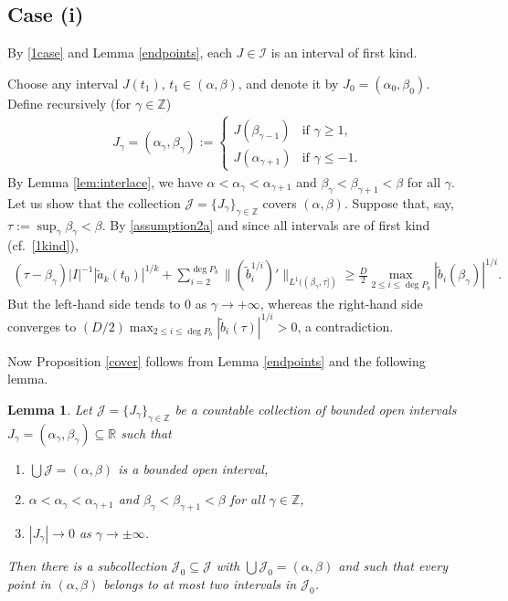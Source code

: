 \documentclass[12pt]{amsart}
\theoremstyle{plain}
\newtheorem{lemma}{Lemma}
\theoremstyle{definition}
\numberwithin{equation}{section}
\begin{document}
\subsection*{Case (i)}
  By \eqref{1case} and Lemma \ref{endpoints}, 
  each $J \in {\mathcal{I}}$ is an interval of first kind. 

  Choose any interval $J(t_1)$, $t_1 \in ({\alpha},{\beta})$, and denote it by $J_0 = ({\alpha}_0,{\beta}_0)$. 
  Define recursively (for ${\gamma} \in {\mathbb{Z}}$)
  \begin{align*}
    J_{\gamma} = ({\alpha}_{\gamma},{\beta}_{\gamma}) := 
    \begin{cases}
      J({\beta}_{{\gamma}-1}) & \text{if } {\gamma} \ge 1, \\
      J({\alpha}_{{\gamma}+1}) & \text{if } {\gamma} \le -1.  
    \end{cases} 
  \end{align*} 
  By Lemma \ref{lem:interlace}, we have ${\alpha} < {\alpha}_{\gamma} < {\alpha}_{{\gamma}+1}$ and ${\beta}_{\gamma} < {\beta}_{{\gamma}+1} < {\beta}$ for all ${\gamma}$.
  Let us show that 
  the collection ${\mathcal{J}} = \{J_{\gamma}\}_{{\gamma} \in {\mathbb{Z}}}$ covers $({\alpha},{\beta})$.   
  Suppose that, say,
  ${\tau} := \sup_{\gamma} {\beta}_{\gamma} <{\beta}$.  
  By \eqref{assumption2a} and since all intervals are of first kind (cf.\ \eqref{1kind}),
  \begin{align*}
    ({\tau} -{\beta}_{\gamma})  |I|^{-1}  {|\tilde a_k(t_0)|^{1/k}}  + \sum_{i=2}^{\deg P_b} \|(\tilde b_i^{1/i})'\|_{L^1 (({\beta}_{\gamma},{\tau}])} 
    \ge   
    \frac{D}{2} \max_{2 \le i \le \deg P_b} |\tilde b_i({\beta}_{\gamma})|^{1/i}. 
  \end{align*}
  But the left-hand side tends to $0$ as ${\gamma} \to +\infty$, whereas the right-hand side converges to 
  $(D/2) \max_{2 \le i \le \deg P_b} |\tilde b_i({\tau})|^{1/i}>0$, a contradiction. 

   
  

  Now Proposition \ref{cover} follows from Lemma \ref{endpoints} and the following lemma.

  \begin{lemma} \label{glue}
  Let ${\mathcal{J}} = \{J_{\gamma}\}_{{\gamma} \in {\mathbb{Z}}}$ be a countable collection of bounded open intervals $J_{\gamma} = ({\alpha}_{\gamma},{\beta}_{\gamma}) \subseteq {\mathbb{R}}$ such that 
  \begin{enumerate}
    \item $\bigcup {\mathcal{J}} = ({\alpha},{\beta})$ is a bounded open interval,
    \item ${\alpha} < {\alpha}_{\gamma} < {\alpha}_{{\gamma}+1}$ and ${\beta}_{\gamma} < {\beta}_{{\gamma}+1}< {\beta}$ for all ${\gamma} \in {\mathbb{Z}}$, 
    \item $|J_{\gamma}| \to 0$ as ${\gamma} \to \pm \infty$.
  \end{enumerate}
  Then there is a subcollection ${\mathcal{J}}_0 \subseteq {\mathcal{J}}$ with 
  $\bigcup {\mathcal{J}}_0 = ({\alpha},{\beta})$ and such that every point in $({\alpha},{\beta})$ 
  belongs to at most two intervals in ${\mathcal{J}}_0$. 
\end{lemma}
\end{document}
